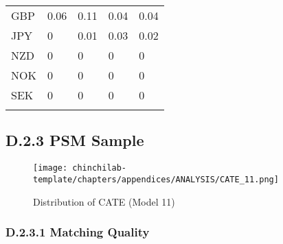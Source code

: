 \begin{table}[H]
\begin{tabular}{lllll}
GBP & \cellcolor[HTML]{F3F9F7}0.06 & \cellcolor[HTML]{EBF6F1}0.11 & \cellcolor[HTML]{F6FAFA}0.04 & \cellcolor[HTML]{F6FAFA}0.04 \\
JPY & \cellcolor[HTML]{FCFCFF}0 & \cellcolor[HTML]{FBFCFE}0.01 & \cellcolor[HTML]{F8FBFB}0.03 & \cellcolor[HTML]{F9FBFD}0.02 \\
NZD & \cellcolor[HTML]{FCFCFF}0 & \cellcolor[HTML]{FCFCFF}0 & \cellcolor[HTML]{FCFCFF}0 & \cellcolor[HTML]{FCFCFF}0 \\
NOK & \cellcolor[HTML]{FCFCFF}0 & \cellcolor[HTML]{FCFCFF}0 & \cellcolor[HTML]{FCFCFF}0 & \cellcolor[HTML]{FCFCFF}0 \\
SEK & \cellcolor[HTML]{FCFCFF}0 & \cellcolor[HTML]{FCFCFF}0 & \cellcolor[HTML]{FCFCFF}0 & \cellcolor[HTML]{FCFCFF}0 \\
\hline \\[-1.8ex] 
\end{tabular}
\end{table}


\newpage

\subsection{D.2.3 PSM Sample}

\begin{figure}[H]
    \centering
    \texttt{[image: chinchilab-template/chapters/appendices/ANALYSIS/CATE\_11.png]}
    \caption{Distribution of CATE (Model 11)}
    \label{fig:my_label}
\end{figure}

\subsubsection{D.2.3.1 Matching Quality}

